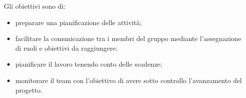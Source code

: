  Gli obiettivi sono di:
\begin{itemize}
	\item{preparare una pianificazione delle attività;}
	\item{facilitare la comunicazione tra i membri del gruppo mediante l'assegnazione di ruoli e obiettivi da raggiungere;}
	\item{pianificare il lavoro tenendo conto delle scadenze;}
	\item{monitorare il team con l'obiettivo di avere sotto controllo l'avanzamento del progetto.}
\end{itemize}
